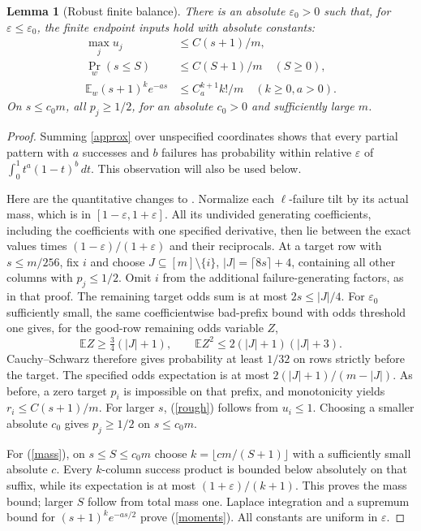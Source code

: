 \documentclass[11pt]{article}
\newtheorem{lemma}{Lemma}
\newcommand{\E}{\mathbb E}
\begin{document}
\begin{lemma}[Robust finite balance]\label{balance}
There is an absolute $\varepsilon_0>0$ such that, for
$\varepsilon\le\varepsilon_0$, the finite endpoint inputs hold with
absolute constants:
\begin{align}
 \max_j u_j&\le C(s+1)/m,\label{rough}\\
 \Pr_w(s\le S)&\le C(S+1)/m\quad(S\ge0),\label{mass}\\
 \E_w(s+1)^k e^{-a s}&\le C_a^{k+1}k!/m
                 \quad(k\ge0,a>0).\label{moments}
\end{align}
On $s\le c_0m$, all $p_j\ge1/2$, for an absolute $c_0>0$ and
sufficiently large $m$.
\end{lemma}
\begin{proof}
Summing \eqref{approx} over unspecified coordinates shows that every
partial pattern with $a$ successes and $b$ failures has probability
within relative $\varepsilon$ of
$\int_0^1t^a(1-t)^b\,dt$. This observation will also be used below.

Here are the quantitative changes to
. Normalize each $\ell$-failure
tilt by its actual mass, which is in $[1-\varepsilon,1+\varepsilon]$.
All its undivided generating coefficients, including the coefficients
with one specified derivative, then lie between the exact values
times $(1-\varepsilon)/(1+\varepsilon)$ and their reciprocals.
At a target row with $s\le m/256$, fix $i$ and choose
$J\subseteq[m]\setminus\{i\}$, $|J|=\lceil8s\rceil+4$, containing
all other columns with $p_j\le1/2$. Omit $i$ from the additional
failure-generating factors, as in that proof. The remaining target
odds sum is at most $2s\le|J|/4$.
For $\varepsilon_0$ sufficiently small, the same coefficientwise
bad-prefix bound with odds threshold one gives, for the good-row
remaining odds variable $Z$,
\[
 \E Z\ge\tfrac34(|J|+1),\qquad
 \E Z^2\le2(|J|+1)(|J|+3).
\]
Cauchy--Schwarz therefore gives probability at least $1/32$ on rows
strictly before the target. The specified odds expectation is at most
$2(|J|+1)/(m-|J|)$. As before, a zero target $p_i$ is impossible on
that prefix, and monotonicity yields $r_i\le C(s+1)/m$.
For larger $s$, (\ref{rough}) follows from $u_i\le1$.
Choosing a smaller absolute $c_0$ gives $p_j\ge1/2$ on $s\le c_0m$.

For (\ref{mass}), on $s\le S\le c_0m$ choose
$k=\lfloor c m/(S+1)\rfloor$ with a sufficiently small absolute $c$.
Every $k$-column success product is bounded below absolutely on that
suffix, while its expectation is at most $(1+\varepsilon)/(k+1)$.
This proves the mass bound; larger $S$ follow from total mass one.
Laplace integration and a supremum bound for $(s+1)^k e^{-as/2}$
prove (\ref{moments}). All constants are uniform in $\varepsilon$.
\end{proof}
\end{document}
